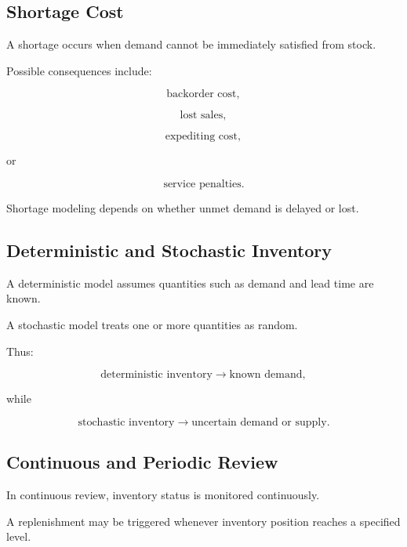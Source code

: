 \subsection{Shortage Cost}
\label{subsec:shortage-cost}

A shortage occurs when demand cannot be immediately satisfied from stock.

Possible consequences include:

\[
\boxed{
\text{backorder cost},
}
\]

\[
\boxed{
\text{lost sales},
}
\]

\[
\boxed{
\text{expediting cost},
}
\]

or

\[
\boxed{
\text{service penalties}.
}
\]

Shortage modeling depends on whether unmet demand is delayed or lost.

\subsection{Deterministic and Stochastic Inventory}
\label{subsec:deterministic-stochastic-inventory}

A deterministic model assumes quantities such as demand and lead time are
known.

A stochastic model treats one or more quantities as random.

Thus:

\[
\boxed{
\text{deterministic inventory}
\rightarrow
\text{known demand},
}
\]

while

\[
\boxed{
\text{stochastic inventory}
\rightarrow
\text{uncertain demand or supply}.
}
\]

\subsection{Continuous and Periodic Review}
\label{subsec:continuous-periodic-review}

In continuous review, inventory status is monitored continuously.

A replenishment may be triggered whenever inventory position reaches a
specified level.

